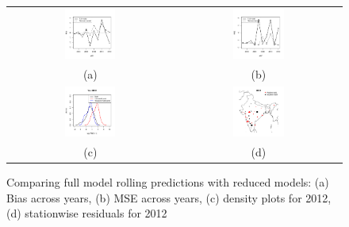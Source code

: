 \begin{figure}
\begin{center}

\begin{tabular}{cc}
		\includegraphics[width=0.32\textwidth]{Chapter-appli/rolling_predbias_full_vs_reduced_gamma.pdf}
	& 
		\includegraphics[width=0.32\textwidth]{Chapter-appli/rolling_predMSE_full_vs_reduced_gamma.pdf} \\
	(a) & (b) \\	
		\includegraphics[width=0.32\textwidth]{Chapter-appli/rolling_density2012_full_vs_reduced_gamma.pdf}
	& 
		\includegraphics[width=0.32\textwidth]{Chapter-appli/rolling_map2012_full_vs_reduced_gamma.pdf} \\
	(c) & (d) \\	
\end{tabular}

\caption{Comparing full model rolling predictions with reduced models: (a) Bias across years, (b) MSE across years, (c) density plots for 2012, (d) stationwise residuals for 2012}
\label{fig:prepost}

\end{center}
\end{figure}


